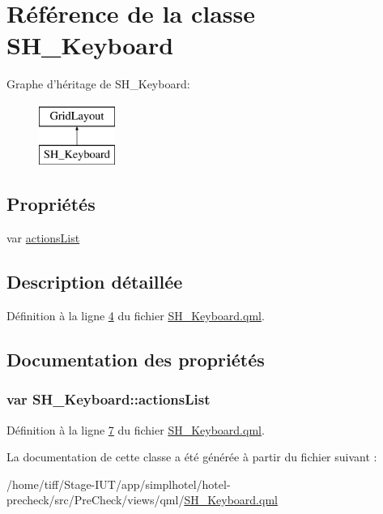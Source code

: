 \hypertarget{classSH__Keyboard}{\section{Référence de la classe S\-H\-\_\-\-Keyboard}
\label{classSH__Keyboard}
}
Graphe d'héritage de S\-H\-\_\-\-Keyboard\-:\begin{figure}[H]
\begin{center}
\leavevmode
\includegraphics[height=2.000000cm]{classSH__Keyboard}
\end{center}
\end{figure}
\subsection*{Propriétés}
\begin{DoxyCompactItemize}
\item 
var \hyperlink{classSH__Keyboard_a0fafeb62ceee0f38c8d7d9d5919795e5}{actions\-List}
\end{DoxyCompactItemize}


\subsection{Description détaillée}


Définition à la ligne \hyperlink{SH__Keyboard_8qml_source_l00004}{4} du fichier \hyperlink{SH__Keyboard_8qml_source}{S\-H\-\_\-\-Keyboard.\-qml}.



\subsection{Documentation des propriétés}
\hypertarget{classSH__Keyboard_a0fafeb62ceee0f38c8d7d9d5919795e5}{
\subsubsection[{actions\-List}]{\setlength{\rightskip}{0pt plus 5cm}var S\-H\-\_\-\-Keyboard\-::actions\-List}}\label{classSH__Keyboard_a0fafeb62ceee0f38c8d7d9d5919795e5}


Définition à la ligne \hyperlink{SH__Keyboard_8qml_source_l00007}{7} du fichier \hyperlink{SH__Keyboard_8qml_source}{S\-H\-\_\-\-Keyboard.\-qml}.



La documentation de cette classe a été générée à partir du fichier suivant \-:\begin{DoxyCompactItemize}
\item 
/home/tiff/\-Stage-\/\-I\-U\-T/app/simplhotel/hotel-\/precheck/src/\-Pre\-Check/views/qml/\hyperlink{SH__Keyboard_8qml}{S\-H\-\_\-\-Keyboard.\-qml}\end{DoxyCompactItemize}
